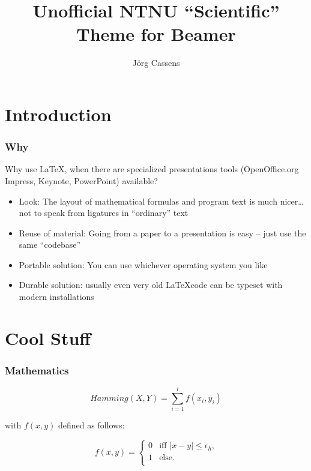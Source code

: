\documentclass{beamer}
\title %
{Unofficial NTNU ``Scientific'' Theme for Beamer}
\author{J\"{o}rg Cassens}
\institute[NTNU] %
{Norwegian University of Science and Technology}
\date[] %
{}
\begin{document}
\begin{frame}
  \titlepage
\end{frame}

\section{Introduction}

\begin{frame}
  \frametitle{Why}

  Why use \LaTeX, when there are specialized presentations tools (OpenOffice.org Impress, Keynote, PowerPoint) available?

  \begin{itemize}
    \item{Look: The layout of mathematical formulas and program text is much nicer\ldots not to speak from ligatures in ``ordinary'' text}
    \item{Reuse of material: Going from a paper to a presentation is easy -- just use the same ``codebase''}
    \item{Portable solution: You can use whichever operating system you like}
    \item{Durable solution: usually even very old \LaTeX code can be typeset with modern installations}
  \end{itemize}

\end{frame}

\section{Cool Stuff}

\begin{frame}
  \frametitle{Mathematics}

  \begin{example}
    \begin{equation}
      \mathit{Hamming} (X,Y) = \sum_{i=1}^{l} f (x_{i}, y_{i})
    \end{equation}
  \end{example}

with $f(x,y)$ defined as follows:

  \begin{definition}
    \begin{equation}
      f(x,y)= \left\{ \begin{array}{ll}
          0 & \mbox{iff $|x-y| \leq \epsilon_{h}$,} \\
          1 & \mbox{else.}      \\
        \end{array}
      \right.
    \end{equation}
  \end{definition}

\end{frame}
\end{document}
